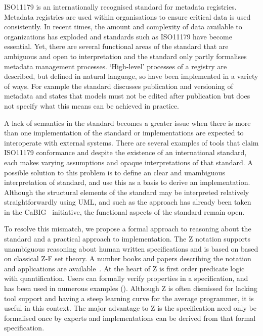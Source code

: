 \documentclass{llncs}
\begin{document}
ISO11179 is an internationally recognised standard for metadata registries. Metadata registries are used within organisations to ensure critical data is used consistently. In recent times, the amount and complexity of data available to organizations has exploded and standards such as ISO11179 have become essential. Yet, there are several functional areas of the standard that are ambiguous and open to interpretation and the standard only partly formalises metadata management processes. `High-level' processes of a registry are described, but defined in natural language, so have been implemented in a variety of ways. For example the standard discusses publication and versioning of metadata and states that models must not be edited after publication but does not specify what this means can be achieved in practice. %

A lack of semantics in the standard becomes a greater issue when there is more than one implementation of the standard or implementations are expected to interoperate with external systems. There are several examples of tools that claim ISO11179 conformance and despite the existence of an international standard, each makes varying assumptions and opaque interpretations of that standard. A possible solution to this problem is to define an clear and unambiguous interpretation of standard, and use this as a basis to derive an implementation. Although the structural elements of the standard may be interpreted relatively straightforwardly using UML, and such as the approach has already been taken in the CaBIG~\cite{Kunz2009} initiative, the functional aspects of the standard remain open.

To resolve this mismatch, we propose a formal approach to reasoning about the standard and a practical approach to implementation. The Z notation supports unambiguous reasoning about human written specifications  and is based on based on classical Z-F set theory. A number books and papers describing the notation and applications are available~\cite{woo96}. At the heart of Z is first order predicate logic with quantification. Users can formally verify properties in a specification, and has been used in numerous examples (\cite{woo96}). Although Z is often dismissed for lacking tool support and having a steep learning curve for the average programmer, it is useful in this context. The major advantage to Z is the specification need only be formalised once by experts and implementations can be derived from that formal specification.
\end{document}
